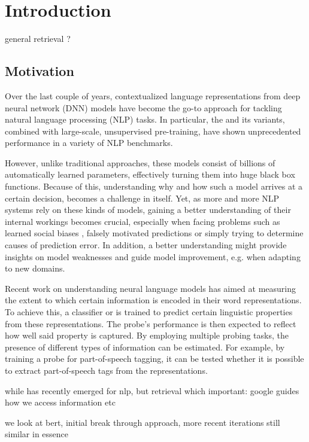 \chapter{Introduction}
general retrieval ?
\section{Motivation}
Over the last couple of years, contextualized language representations from deep neural network (DNN) models have become the go-to approach for tackling natural language processing (NLP) tasks. In particular, the  \cite{vaswani2017attention} and its variants, combined with large-scale, unsupervised pre-training, have shown unprecedented performance in a variety of NLP benchmarks.

However, unlike traditional approaches, these models consist of billions of automatically learned parameters, effectively turning them into huge black box functions. Because of this, understanding why and how such a model arrives at a certain decision, becomes a challenge in itself. Yet, as more and more NLP systems rely on these kinds of models, gaining a better understanding of their internal workings becomes crucial, especially when facing problems such as learned social biases \cite{Nadeem2021StereoSetMS,Bender2021OnTD, kurita2019measuring}, falsely motivated predictions \cite{10.1145/2939672.2939778, DBLP:journals/corr/abs-1802-00614} or simply trying to determine causes of prediction error. In addition, a better understanding might provide insights on model weaknesses and guide model improvement, e.g. when adapting to new domains.

Recent work on understanding neural language models has aimed at measuring the extent to which certain information is encoded in their word representations. To achieve this, a  classifier or  is trained to predict certain linguistic properties from these representations. The probe's performance is then expected to reflect how well said property is captured. By employing multiple probing tasks, the presence of different types of information can be estimated. For example, by training a probe for part-of-speech tagging, it can be tested whether it is possible to extract part-of-speech tags from the representations.


while has recently emerged for nlp, but retrieval which important: google guides how we access information etc

we look at bert, initial break through approach, more recent iterations still similar in essence

